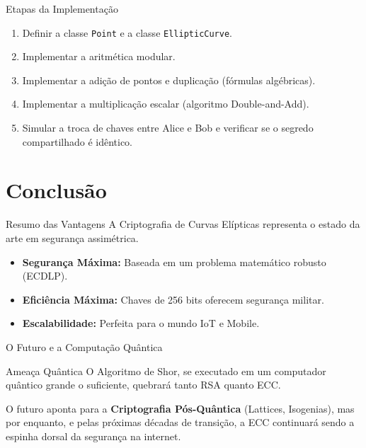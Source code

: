 \documentclass[aspectratio=169]{beamer}
\begin{document}
\begin{frame}{Etapas da Implementação}
  \begin{enumerate}
      \item Definir a classe \texttt{Point} e a classe \texttt{EllipticCurve}.
      \item Implementar a aritmética modular.
      \item Implementar a adição de pontos e duplicação (fórmulas algébricas).
      \item Implementar a multiplicação escalar (algoritmo Double-and-Add).
      \item Simular a troca de chaves entre Alice e Bob e verificar se o segredo compartilhado é idêntico.
  \end{enumerate}
\end{frame}

\section{Conclusão}

\begin{frame}{Resumo das Vantagens}
  A Criptografia de Curvas Elípticas representa o estado da arte em segurança assimétrica.
  
  \begin{itemize}
      \item \textbf{Segurança Máxima:} Baseada em um problema matemático robusto (ECDLP).
      \item \textbf{Eficiência Máxima:} Chaves de 256 bits oferecem segurança militar.
      \item \textbf{Escalabilidade:} Perfeita para o mundo IoT e Mobile.
  \end{itemize}
\end{frame}

\begin{frame}{O Futuro e a Computação Quântica}
  \begin{alertblock}{Ameaça Quântica}
    O Algoritmo de Shor, se executado em um computador quântico grande o suficiente, quebrará tanto RSA quanto ECC.
  \end{alertblock}
  
  \vspace{0.3cm}
  O futuro aponta para a \textbf{Criptografia Pós-Quântica} (Lattices, Isogenias), mas por enquanto, e pelas próximas décadas de transição, a ECC continuará sendo a espinha dorsal da segurança na internet.
\end{frame}
\end{document}
